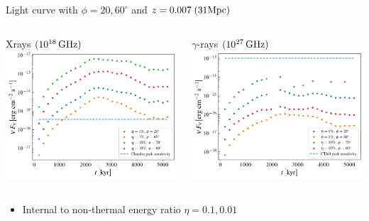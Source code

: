 \begin{frame}{Light curve with $\phi=20,60^{\circ}$ and $z=0.007\;(31{\rm Mpc})$}
	\begin{columns}
		\begin{column}{.5\textwidth}
		\centering
		{\scriptsize Xrays $(10^{18}\,{\rm GHz})$}
			\includegraphics[width=.95\textwidth]{images/Chandra_Sync.png}
		\end{column}
		\begin{column}{.5\textwidth}
				\centering
          {\scriptsize $\gamma$-rays $(10^{27}\,{\rm GHz})$}
   	\includegraphics[width=.95\textwidth]{images/CTAO_IC.png}
		\end{column}
	\end{columns}
		{\scriptsize
			\begin{itemize}
				\item Internal to non-thermal energy ratio $\eta=0.1,0.01$ 
				
			\end{itemize}
		}
\end{frame}

